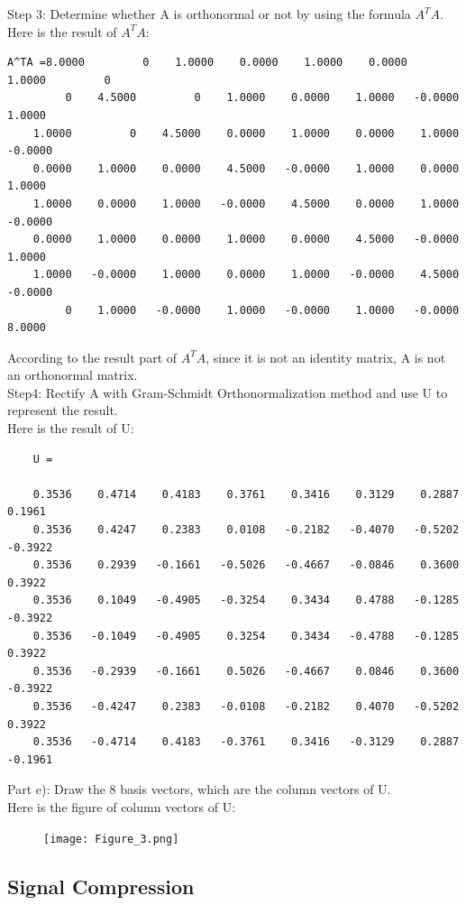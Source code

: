 \documentclass{article}
\begin{document}
Step 3: Determine whether A is orthonormal or not by using the formula $A^TA$.\\
Here is the result of $A^TA$:\\
\begin{verbatim}
A^TA =8.0000         0    1.0000    0.0000    1.0000    0.0000    1.0000         0
         0    4.5000         0    1.0000    0.0000    1.0000   -0.0000    1.0000
    1.0000         0    4.5000    0.0000    1.0000    0.0000    1.0000   -0.0000
    0.0000    1.0000    0.0000    4.5000   -0.0000    1.0000    0.0000    1.0000
    1.0000    0.0000    1.0000   -0.0000    4.5000    0.0000    1.0000   -0.0000
    0.0000    1.0000    0.0000    1.0000    0.0000    4.5000   -0.0000    1.0000
    1.0000   -0.0000    1.0000    0.0000    1.0000   -0.0000    4.5000   -0.0000
         0    1.0000   -0.0000    1.0000   -0.0000    1.0000   -0.0000    8.0000
\end{verbatim}
According to the result part of $A^TA$, since it is not an identity matrix, A is not an orthonormal matrix. \\
Step4: Rectify A with Gram-Schmidt Orthonormalization method and use U to represent the result.\\ 
Here is the result of U: \\
\begin{verbatim}
    U =

    0.3536    0.4714    0.4183    0.3761    0.3416    0.3129    0.2887    0.1961
    0.3536    0.4247    0.2383    0.0108   -0.2182   -0.4070   -0.5202   -0.3922
    0.3536    0.2939   -0.1661   -0.5026   -0.4667   -0.0846    0.3600    0.3922
    0.3536    0.1049   -0.4905   -0.3254    0.3434    0.4788   -0.1285   -0.3922
    0.3536   -0.1049   -0.4905    0.3254    0.3434   -0.4788   -0.1285    0.3922
    0.3536   -0.2939   -0.1661    0.5026   -0.4667    0.0846    0.3600   -0.3922
    0.3536   -0.4247    0.2383   -0.0108   -0.2182    0.4070   -0.5202    0.3922
    0.3536   -0.4714    0.4183   -0.3761    0.3416   -0.3129    0.2887   -0.1961
\end{verbatim}
Part e): Draw the 8 basis vectors, which are the column vectors of U.\\
Here is the figure of column vectors of U:\\

\begin{figure}[H]
  \centering
  \texttt{[image: Figure\_3.png]}
  \label{fig:music}
\end{figure}
\subsection{Signal Compression}
\end{document}
